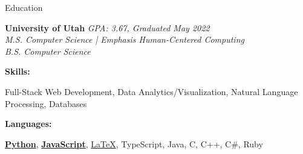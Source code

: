 \documentclass{resume}
\begin{document}
%
%


%
%

\begin{rSection}{Education}

{\bf University of Utah} \hfill {\em GPA: 3.67, Graduated May 2022}
\vspace{2pt}
\emph{
    \\ M.S. Computer Science | Emphasis Human-Centered Computing
    \\ B.S. Computer Science
}

\vspace{-0.3em}
{\bf Skills:}
\vspace{-1.83em}

\begin{adjustwidth}{3.5em}{0pt}
    Full-Stack Web Development,
    Data Analytics/Visualization,
    Natural Language Processing,
    Databases
\end{adjustwidth}

\vspace{-0.4em}
{\bf Languages:}
\vspace{-1.83em}
\begin{adjustwidth}{6em}{0pt}
    {\bf \href{https://github.com/jlucasa?tab=repositories&q=&type=&language=python&sort=}{Python}},
    {\bf \href{https://github.com/jlucasa?tab=repositories&q=&type=&language=javascript&sort=}{JavaScript}},
    \href{https://github.com/jlucasa?tab=repositories&q=&type=&language=tex&sort=}{\LaTeX},
    TypeScript,
    Java,
    C,
    C++,
    C\#,
    Ruby
\end{adjustwidth}


\end{rSection}
\end{document}
